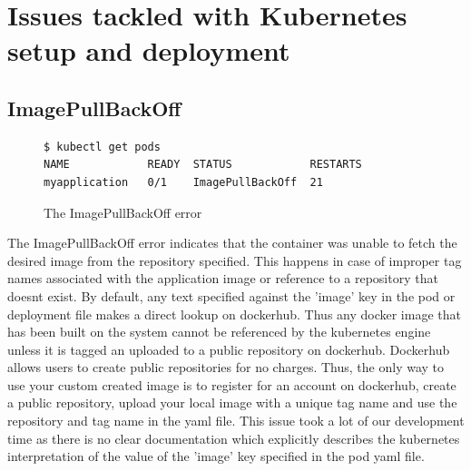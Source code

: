 \documentclass[9pt,twocolumn,twoside]{../../styles/osajnl}
\begin{document}
\section{Issues tackled with Kubernetes setup and deployment}

\subsection{ImagePullBackOff}

\begin{figure}[H]
\begin{verbatim}
$ kubectl get pods
NAME            READY  STATUS            RESTARTS  
myapplication   0/1    ImagePullBackOff  21         
\end{verbatim}
\caption{The ImagePullBackOff error}
\vspace{-3mm}
\label{The ImagePullBackOff error}
\end{figure}

The ImagePullBackOff error indicates that the container was unable to
fetch the desired image from the repository specified. This happens in
case of improper tag names associated with the application image or
reference to a repository that doesnt exist.  By default, any text
specified against the 'image' key in the pod or deployment file makes
a direct lookup on dockerhub. Thus any docker image that has been
built on the system cannot be referenced by the kubernetes engine
unless it is tagged an uploaded to a public repository on
dockerhub. Dockerhub allows users to create public repositories for no
charges. Thus, the only way to use your custom created image is to
register for an account on dockerhub, create a public repository,
upload your local image with a unique tag name and use the repository
and tag name in the yaml file. This issue took a lot of our
development time as there is no clear documentation which explicitly
describes the kubernetes interpretation of the value of the 'image'
key specified in the pod yaml file.
\end{document}
